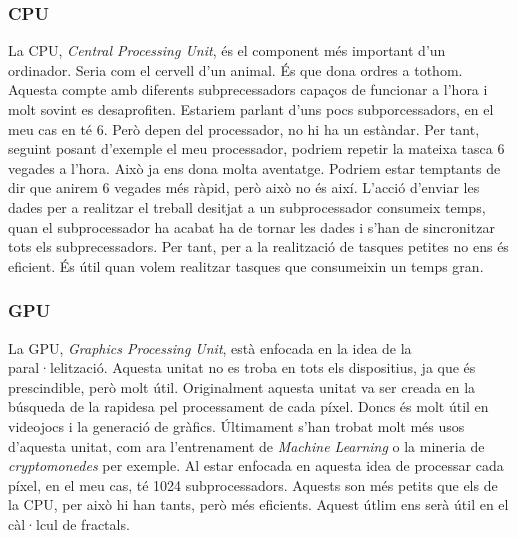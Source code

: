 \subsubsection{CPU}
La CPU, \emph{Central Processing Unit}, és el component més important d'un ordinador. Seria com el cervell d'un animal. És que dona ordres a tothom. Aquesta compte amb diferents subprecessadors capaços de funcionar a l'hora i molt sovint es desaprofiten. \n
Estariem parlant d'uns pocs subporcessadors, en el meu cas en té 6. Però depen del processador, no hi ha un estàndar. \n
Per tant, seguint posant d'exemple el meu processador, podriem repetir la mateixa tasca 6 vegades a l'hora. Això ja ens dona molta aventatge. \n
Podriem estar temptants de dir que anirem 6 vegades més ràpid, però això no és així. L'acció d'enviar les dades per a realitzar el treball desitjat a un subprocessador consumeix temps, quan el subprocessador ha acabat ha de tornar les dades i s'han de sincronitzar tots els subprecessadors. Per tant, per a la realització de tasques petites no ens és eficient. \n
És útil quan volem realitzar tasques que consumeixin un temps gran.

\subsubsection{GPU}
La GPU, \emph{Graphics Processing Unit}, està enfocada en la idea de la paral·lelització. Aquesta unitat no es troba en tots els dispositius, ja que és prescindible, però molt útil. Originalment aquesta unitat va ser creada en la búsqueda de la rapidesa pel processament de cada píxel. Doncs és molt útil en videojocs i la generació de gràfics. \n
Últimament s'han trobat molt més usos d'aquesta unitat, com ara l'entrenament de \emph{Machine Learning} o la mineria de \emph{cryptomonedes} per exemple. \n
Al estar enfocada en aquesta idea de processar cada píxel, en el meu cas, té 1024 subprocessadors. Aquests son més petits que els de la CPU, per això hi han tants, però més eficients. \n
Aquest útlim ens serà útil en el càl·lcul de fractals.
